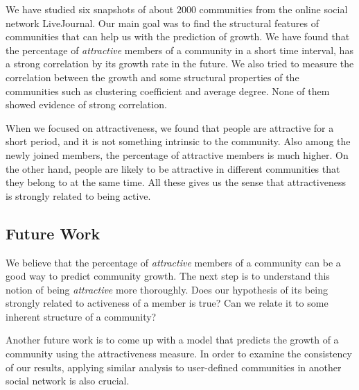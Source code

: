 We have studied six snapshots of about $2000$ communities from the online social network LiveJournal. Our main goal was to find the structural features of communities that can help us with the prediction of growth. We have found that the percentage of \emph{attractive} members of a community in a short time interval, has a strong correlation by its growth rate in the future. We also tried to measure the correlation between the growth and some structural properties of the communities such as  clustering coefficient and average degree. None of them showed evidence of strong correlation.

When we focused on  attractiveness, we found that people are attractive for a short period, and it is not something intrinsic to the community. Also among the newly joined members, the percentage of attractive members is much higher. On the other hand, people are likely to be attractive in different communities that they belong to at the same time.  All these gives us the sense that attractiveness is strongly related to being active.

\subsection{Future Work}

We believe that the percentage of \emph{attractive} members of a community can be a good way to
predict  community growth. The next step is to understand this notion of being \emph{attractive} more 
thoroughly. Does our hypothesis of its being strongly related to activeness of a member is true? 
Can we relate it to some inherent structure of a community? 

Another future work is to come up with a model that predicts the growth of a community using the attractiveness measure. In order to examine the consistency of our results, applying similar analysis to user-defined communities in another social network  is also crucial.